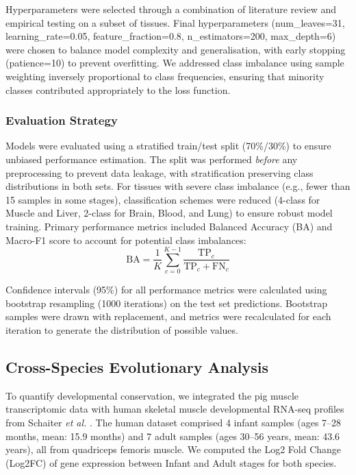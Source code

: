 Hyperparameters were selected through a combination of literature review and empirical testing on a subset of tissues. Final hyperparameters (num\_leaves=31, learning\_rate=0.05, feature\_fraction=0.8, n\_estimators=200, max\_depth=6) were chosen to balance model complexity and generalisation, with early stopping (patience=10) to prevent overfitting. We addressed class imbalance using sample weighting inversely proportional to class frequencies, ensuring that minority classes contributed appropriately to the loss function.

\subsubsection{Evaluation Strategy}
Models were evaluated using a stratified train/test split (70\%/30\%) to ensure unbiased performance estimation. The split was performed \textit{before} any preprocessing to prevent data leakage, with stratification preserving class distributions in both sets. For tissues with severe class imbalance (e.g., fewer than 15 samples in some stages), classification schemes were reduced (4-class for Muscle and Liver, 2-class for Brain, Blood, and Lung) to ensure robust model training. Primary performance metrics included Balanced Accuracy (BA) and Macro-F1 score to account for potential class imbalances:
\begin{equation}
\mathrm{BA} = \frac{1}{K} \sum_{c=0}^{K-1} \frac{\mathrm{TP}_c}{\mathrm{TP}_c + \mathrm{FN}_c}
\label{eq:ba}
\end{equation}

Confidence intervals (95\%) for all performance metrics were calculated using bootstrap resampling (1000 iterations) on the test set predictions. Bootstrap samples were drawn with replacement, and metrics were recalculated for each iteration to generate the distribution of possible values.

\subsection{Cross-Species Evolutionary Analysis}
To quantify developmental conservation, we integrated the pig muscle transcriptomic data with human skeletal muscle developmental RNA-seq profiles from Schaiter \textit{et al.} \cite{schaiter2024}. The human dataset comprised 4 infant samples (ages 7--28 months, mean: 15.9 months) and 7 adult samples (ages 30--56 years, mean: 43.6 years), all from quadriceps femoris muscle. We computed the Log2 Fold Change (Log2FC) of gene expression between Infant and Adult stages for both species.

